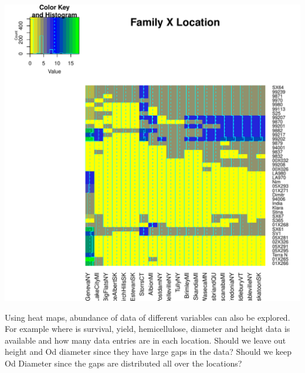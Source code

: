 \documentclass{article}\usepackage[]{graphicx}\usepackage[]{color}
\makeatletter
\def\maxwidth{ %
  \ifdim\Gin@nat@width>\linewidth
    \linewidth
  \else
    \Gin@nat@width
  \fi
}
\newenvironment{knitrout}{}{} %
\makeatother
\begin{document}
\begin{knitrout}
{}




{\centering \includegraphics[width=\maxwidth]{figure/HeatmapCloneSASLocation-4} 

}



\end{knitrout}

\newpage
Using heat maps, abundance of data of different variables can also be explored. For example where is survival, yield, hemicellulose, diameter and height data is available and how many data entries are in each location. Should we leave out height and Od diameter since they have large gaps in the data? Should we keep Od Diameter since the gaps are distributed all over the locations?\\
\end{document}
